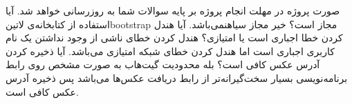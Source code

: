 
صورت پروژه در مهلت انجام پروژه بر پایه سوالات شما به روزرسانی خواهد شد.
 آیا استفاده از کتابخانه‌ی ‌لاتین{bootstrap} مجاز است؟
 خیر مجاز ‌سیاه{نمی‌باشد}.
 آیا هندل کردن خطا اجباری است یا امتیازی؟
 هندل کردن خطای ناشی از وجود نداشتن یک نام کاربری اجباری است اما هندل کردن خطای شبکه امتیازی می‌باشد.
 آیا ذخیره کردن آدرس عکس کافی است؟
 بله محدودیت گیت‌هاب به صورت مشخص روی رابط برنامه‌نویسی بسیار سخت‌گیرانه‌تر از رابط دریافت عکس‌ها می‌باشد پس ذخیره آدرس عکس کافی است.
